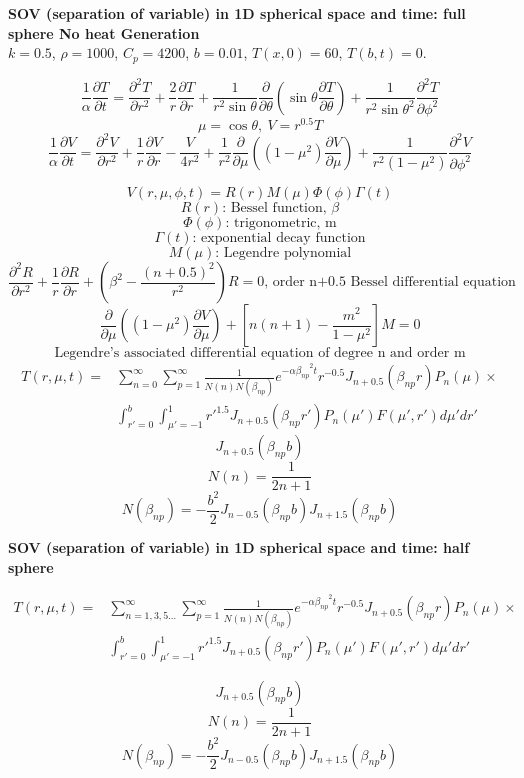 \begin{example}
\textbf{SOV (separation of variable) in 1D spherical space and time: full sphere No heat Generation}\\
$k = 0.5$, $\rho= 1000$, $C_p = 4200$, $b=0.01$, $T(x,0)=60$, $T(b,t)=0$.

$$ 
\frac{1}{\alpha}\frac{\partial T}{\partial t}=
\frac{\partial^2 T}{\partial r^2}+
\frac{2}{r}\frac{\partial T}{\partial r}+
\frac{1}{r^2\sin \theta} \frac{\partial}{\partial \theta}
\left( \sin\theta\frac{\partial T}{\partial \theta} \right)
+\frac{1}{r^2{\sin{\theta}}^2}\frac{\partial^2 T}{\partial \phi^2}
$$
$$\mu=\cos \theta,~V=r^{0.5}T$$
$$
\frac{1}{\alpha}\frac{\partial V}{\partial t}=
\frac{\partial^2 V}{\partial r^2}+
\frac{1}{r}\frac{\partial V}{\partial r}-
\frac{V}{4r^2}+
\frac{1}{r^2}\frac{\partial}{\partial \mu}
\left( (1-\mu^2)\frac{\partial V}{\partial \mu}\right)+
\frac{1}{r^2(1-\mu^2)}\frac{\partial^2 V}{\partial \phi^2}
$$

$$V(r,\mu,\phi,t)=R(r)M(\mu)\Phi(\phi)\Gamma(t)$$
$$R(r)\text{: Bessel function, }\beta$$
$$\Phi(\phi)\text{: trigonometric, m}$$
$$\Gamma(t)\text{: exponential decay function}$$
$$M(\mu)\text{: Legendre polynomial}$$
$$ 
\frac{\partial^2 R}{\partial r^2}+
\frac{1}{r}\frac{\partial R}{\partial r}+
\left(\beta^2-\frac{(n+0.5)^2}{r^2}\right) R 
=0\text{, order n+0.5 Bessel differential equation}
$$
$$
\frac{\partial}{\partial \mu}
\left( (1-\mu^2)\frac{\partial V}{\partial \mu}\right)+
\left[ n(n+1)-\frac{m^2}{1-\mu^2} \right]M=0
$$
$$\text{Legendre’s associated differential equation of degree n and order m}$$
\begin{equation*}
\begin{aligned}
T(r,\mu,t)=&\sum_{n=0}^{\infty}\sum_{p=1}^{\infty} \frac{1}{N(n)N(\beta_{np})}
e^{-\alpha{\beta_{np}}^2t}r^{-0.5}J_{n+0.5}(\beta_{np}r)P_n(\mu)\times\\
&\int_{r'=0}^{b}\int_{\mu'=-1}^{1} {r'}^{1.5}J_{n+0.5}(\beta_{np}r')P_n(\mu')F(\mu',r')d\mu'dr'
\end{aligned}
\end{equation*}
$$J_{n+0.5}(\beta_{np}b)$$
$$N(n)=\frac{1}{2n+1}$$
$$N(\beta_{np})=-\frac{b^2}{2}J_{n-0.5}(\beta_{np}b)J_{n+1.5}(\beta_{np}b)$$


\end{example}

\begin{example}
\textbf{SOV (separation of variable) in 1D spherical space and time: half sphere}

\begin{equation*}
\begin{aligned}
T(r,\mu,t)=&\sum_{n=1,3,5\dots}^{\infty}\sum_{p=1}^{\infty} \frac{1}{N(n)N(\beta_{np})}
e^{-\alpha{\beta_{np}}^2t}r^{-0.5}J_{n+0.5}(\beta_{np}r)P_n(\mu)\times\\
&\int_{r'=0}^{b}\int_{\mu'=-1}^{1} {r'}^{1.5}J_{n+0.5}(\beta_{np}r')P_n(\mu')
F(\mu',r')d\mu'dr'
\end{aligned}
\end{equation*}

$$J_{n+0.5}(\beta_{np}b)$$
$$N(n)=\frac{1}{2n+1}$$
$$N(\beta_{np})=-\frac{b^2}{2}J_{n-0.5}(\beta_{np}b)J_{n+1.5}(\beta_{np}b)$$
\end{example}

